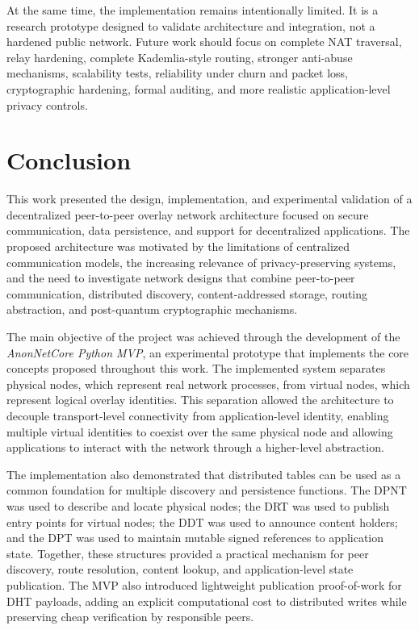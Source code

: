 \documentclass[12pt]{article}
\begin{document}
At the same time, the implementation remains intentionally limited. It is a research prototype designed to validate architecture and integration, not a hardened public network. Future work should focus on complete NAT traversal, relay hardening, complete Kademlia-style routing, stronger anti-abuse mechanisms, scalability tests, reliability under churn and packet loss, cryptographic hardening, formal auditing, and more realistic application-level privacy controls.

















\section{Conclusion}
\label{sec:conclusion}

This work presented the design, implementation, and experimental validation of a decentralized peer-to-peer overlay network architecture focused on secure communication, data persistence, and support for decentralized applications. The proposed architecture was motivated by the limitations of centralized communication models, the increasing relevance of privacy-preserving systems, and the need to investigate network designs that combine peer-to-peer communication, distributed discovery, content-addressed storage, routing abstraction, and post-quantum cryptographic mechanisms.

The main objective of the project was achieved through the development of the \textit{AnonNetCore Python MVP}, an experimental prototype that implements the core concepts proposed throughout this work. The implemented system separates physical nodes, which represent real network processes, from virtual nodes, which represent logical overlay identities. This separation allowed the architecture to decouple transport-level connectivity from application-level identity, enabling multiple virtual identities to coexist over the same physical node and allowing applications to interact with the network through a higher-level abstraction.

The implementation also demonstrated that distributed tables can be used as a common foundation for multiple discovery and persistence functions. The DPNT was used to describe and locate physical nodes; the DRT was used to publish entry points for virtual nodes; the DDT was used to announce content holders; and the DPT was used to maintain mutable signed references to application state. Together, these structures provided a practical mechanism for peer discovery, route resolution, content lookup, and application-level state publication. The MVP also introduced lightweight publication proof-of-work for DHT payloads, adding an explicit computational cost to distributed writes while preserving cheap verification by responsible peers.
\end{document}
